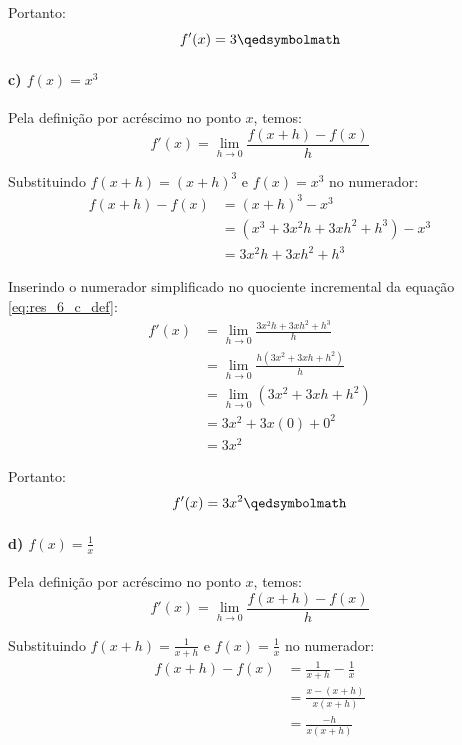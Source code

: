 Portanto:
\[
  f'(x) = 3 \qedsymbolmath
\]

\setcounter{equation}{0}
\paragraph{c) $f(x) = x^3$}

Pela definição por acréscimo no ponto $x$, temos:
\begin{equation}
f'(x) = \lim_{h \to 0} \frac{f(x + h) - f(x)}{h} \label{eq:res_6_c_def}
\end{equation}

Substituindo $f(x + h) = (x + h)^3$ e $f(x) = x^3$ no numerador:
\begin{align*}
f(x + h) - f(x) &= (x + h)^3 - x^3 \\
&= (x^3 + 3x^2h + 3xh^2 + h^3) - x^3 \\
&= 3x^2h + 3xh^2 + h^3
\end{align*}

Inserindo o numerador simplificado no quociente incremental da equação \eqref{eq:res_6_c_def}:
\begin{align*}
f'(x) &= \lim_{h \to 0} \frac{3x^2h + 3xh^2 + h^3}{h} \\
      &= \lim_{h \to 0} \frac{h(3x^2 + 3xh + h^2)}{h} \\
      &= \lim_{h \to 0} (3x^2 + 3xh + h^2) \\
      &= 3x^2 + 3x(0) + 0^2 \\
      &= 3x^2
\end{align*}

Portanto:
\[
  f'(x) = 3x^2 \qedsymbolmath
\]

\setcounter{equation}{0}
\paragraph{d) $f(x) = \frac{1}{x}$}

Pela definição por acréscimo no ponto $x$, temos:
\begin{equation}
f'(x) = \lim_{h \to 0} \frac{f(x + h) - f(x)}{h} \label{eq:res_6_d_def}
\end{equation}

Substituindo $f(x + h) = \frac{1}{x + h}$ e $f(x) = \frac{1}{x}$ no numerador:
\begin{align*}
f(x + h) - f(x) &= \frac{1}{x + h} - \frac{1}{x} \\
&= \frac{x - (x + h)}{x(x + h)} \\
&= \frac{-h}{x(x + h)}
\end{align*}

